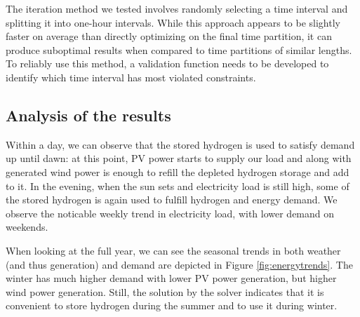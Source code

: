\documentclass[english]{article}
\numberwithin{definition}{section}
\numberwithin{theorem}{section}
\numberwithin{problem}{section}
\begin{document}
The iteration method we tested involves randomly selecting a time interval and splitting it into one-hour
intervals. While this approach appears to be slightly faster on average than directly optimizing on the final
time partition, it can produce suboptimal results when compared to time partitions of similar lengths.
To reliably use this method, a validation function needs to be developed to identify which time interval has most violated constraints.
\subsection{Analysis of the results}

Within a day, we can observe that the stored hydrogen is used to satisfy demand up until dawn: at this point, PV power starts to supply our load and along with generated wind power is enough to refill the depleted hydrogen storage and add to it. In the evening, when the sun sets and electricity load is still high, some of the stored hydrogen is again used to fulfill hydrogen and energy demand. We observe the noticable weekly trend in electricity load, with lower demand on weekends. 


When looking at the full year, we can see the seasonal trends in both weather (and thus generation) and demand are depicted in Figure \ref{fig:energytrends}. The winter has much higher demand with lower PV power generation, but higher wind power generation. Still, the solution by the solver indicates that it is convenient to store hydrogen during the summer and to use it during winter.\\
\end{document}
